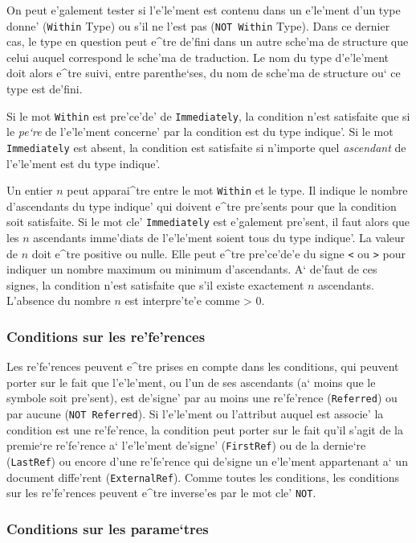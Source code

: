 {On peut e'galement tester si l'e'le'ment est contenu dans un e'le'ment d'un
type donne' ({\tt Within} Type) ou s'il ne l'est pas ({\tt NOT Within} Type).
Dans ce dernier cas, le type en question peut e^tre de'fini dans un autre
sche'ma de structure que celui auquel correspond le sche'ma de traduction.
Le nom du type d'e'le'ment doit alors e^tre suivi, entre parenthe`ses, du
nom de sche'ma de structure ou` ce type est de'fini.

Si le mot {\tt Within} est pre'ce'de' de {\tt Immediately},
la condition n'est satisfaite que si le {\em pe`re} de l'e'le'ment concerne'
par la condition est du type indique'. Si le mot {\tt Immediately} est absent,
la condition est satisfaite si n'importe quel {\em ascendant} de l'e'le'ment
est du type indique'.

Un entier $n$ peut apparai^tre entre le mot {\tt Within} et le type.
Il indique le nombre d'ascendants du type indique' qui doivent e^tre
pre'sents pour que la condition soit satisfaite. Si le mot cle'
{\tt Immediately} est e'galement pre'sent, il faut alors que les $n$
ascendants imme'diats de l'e'le'ment soient tous du type indique'.
La valeur de $n$ doit e^tre positive ou nulle. Elle peut e^tre pre'ce'de'e
du signe {\tt <} ou {\tt >} pour indiquer un nombre maximum ou minimum
d'ascendants. A` de'faut de ces signes, la condition n'est satisfaite que
s'il existe exactement $n$ ascendants. L'absence du nombre $n$ est
interpre'te'e comme > 0.

\subsubsection{Conditions sur les re'fe'rences}

Les re'fe'rences peuvent e^tre prises en compte dans les conditions, qui
peuvent porter sur le fait que l'e'le'ment, ou l'un de ses ascendants
(a` moins que le symbole {\tt *} soit pre'sent), est
de'signe' par au moins une re'fe'rence ({\tt Referred}) ou par aucune
({\tt NOT Referred}). Si l'e'le'ment ou l'attribut auquel est associe' la
condition est une re'fe'rence, la condition peut porter sur le fait qu'il
s'agit de la premie`re re'fe'rence a` l'e'le'ment de'signe' ({\tt FirstRef})
ou de la dernie`re ({\tt LastRef}) ou encore d'une re'fe'rence qui de'signe
un e'le'ment appartenant a` un document diffe'rent ({\tt ExternalRef}).
Comme toutes les conditions, les conditions sur les re'fe'rences peuvent
e^tre inverse'es par le mot cle' {\tt NOT}.

\subsubsection{Conditions sur les parame`tres}

}
